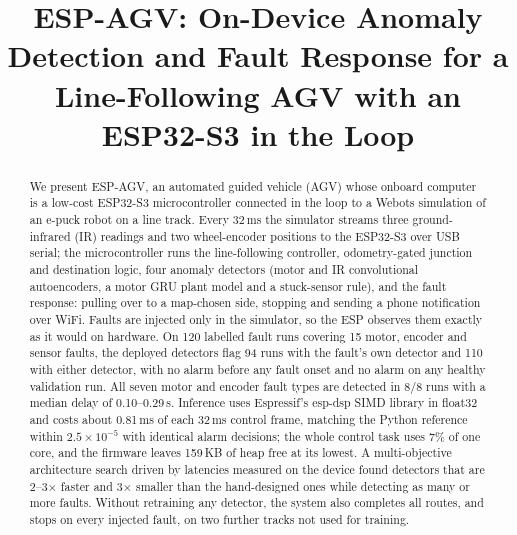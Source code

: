 \documentclass[conference]{IEEEtran}
\begin{document}
\title{ESP-AGV: On-Device Anomaly Detection and Fault Response for a Line-Following AGV with an ESP32-S3 in the Loop}

\author{
\and
{}
}

\maketitle

\begin{abstract}
We present ESP-AGV, an automated guided vehicle (AGV) whose onboard computer is a
low-cost ESP32-S3 microcontroller connected in the loop to a Webots simulation of
an e-puck robot on a line track. Every 32\,ms the simulator streams three
ground-infrared (IR) readings and two wheel-encoder positions to the ESP32-S3 over
USB serial; the microcontroller runs the line-following controller, odometry-gated
junction and destination logic, four anomaly detectors (motor and IR convolutional
autoencoders, a motor GRU plant model and a stuck-sensor rule), and the fault
response: pulling over to a map-chosen side, stopping and sending a phone
notification over WiFi. Faults are injected only in the simulator, so the ESP
observes them exactly as it would on hardware. On 120 labelled fault runs covering
15 motor, encoder and sensor faults, the deployed detectors flag 94 runs with the
fault's own detector and 110 with either detector, with no alarm before any fault
onset and no alarm on any healthy validation run. All seven motor and encoder fault
types are detected in 8/8 runs with a median delay of 0.10--0.29\,s. Inference uses
Espressif's esp-dsp SIMD library in float32 and costs about 0.81\,ms of each
32\,ms control frame, matching the Python reference within $2.5\times10^{-5}$ with
identical alarm decisions; the whole control task uses 7\% of one core, and the
firmware leaves 159\,KB of heap free at its lowest. A multi-objective architecture search driven by
latencies measured on the device found detectors that are 2--3$\times$ faster and
3$\times$ smaller than the hand-designed ones while detecting as many or more
faults. Without retraining any detector, the system also completes all routes,
and stops on every injected fault, on two further tracks not used for training.
\end{abstract}
\end{document}
